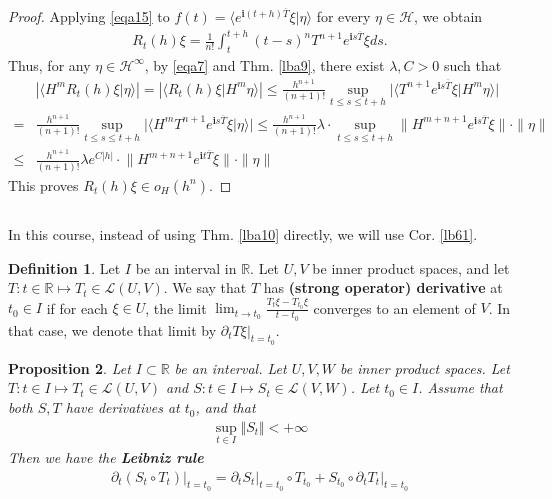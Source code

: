 \documentclass[12pt,b5paper,notitlepage]{article}
\theoremstyle{definition}
\newtheorem{df}{Definition}[section]
\theoremstyle{plain}
\newtheorem{pp}[df]{Proposition}
\newcommand{\mc}{\mathcal}
\newcommand{\ovl}{\overline}
\newcommand{\bk}[1]{\langle {#1}\rangle}
\newcommand{\im}{\mathbf{i}}
\newcommand{\Rbb}{\mathbb R}
\newcommand{\dps}{\displaystyle}
\numberwithin{equation}{section}
\begin{document}
\begin{proof}
Applying \eqref{eqa15} to $f(t)=\bk{e^{\im(t+h)\ovl T}\xi|\eta}$ for every $\eta\in\mc H$, we obtain
\begin{align*}
R_t(h)\xi=\frac 1{n!}\int_t^{t+h}(t-s)^nT^{n+1}e^{\im s\ovl T}\xi ds.
\end{align*}
Thus, for any $\eta\in\mc H^\infty$, by \eqref{eqa7} and Thm. \ref{lba9}, there exist $\lambda,C>0$ such that
\begin{align*}
&|\bk{H^mR_t(h)\xi|\eta}|=|\bk{R_t(h)\xi|H^m\eta}|\leq \frac {h^{n+1}}{(n+1)!}\sup_{t\leq s\leq t+h}\big|\bk{T^{n+1}e^{\im s\ovl T}\xi|H^m\eta}\big|\\
=&\frac {h^{n+1}}{(n+1)!}\sup_{t\leq s\leq t+h}\big|\bk{H^mT^{n+1}e^{\im s\ovl T}\xi|\eta}\big|\leq\frac {h^{n+1}}{(n+1)!}\lambda\cdot\sup_{t\leq s\leq t+h}\lVert H^{m+n+1}e^{\im s\ovl T}\xi\lVert\cdot\lVert\eta\lVert\\
	\leq&\frac {h^{n+1}}{(n+1)!}\lambda e^{C|h|}\cdot\lVert H^{m+n+1}e^{\im t\ovl T}\xi\lVert\cdot\lVert\eta\lVert
\end{align*}
This proves $R_t(h)\xi\in o_H(h^n)$.
\end{proof}
	


\subsection{}


In this course, instead of using Thm. \ref{lba10} directly, we will use Cor. \ref{lb61}.

\begin{df}
Let $I$ be an interval in $\Rbb$. Let $U,V$ be inner product spaces, and let $T:t\in\Rbb\mapsto T_t\in\mc L(U,V)$. We say that $T$ has \textbf{(strong operator) derivative} at $t_0\in I$ if for each $\xi\in U$, the limit $\dps\lim_{t\rightarrow t_0}\frac{T_t\xi-T_{t_0}\xi}{t-t_0}$ converges to an element of $V$. In that case, we denote that limit by $\partial_tT\xi|_{t=t_0}$.
\end{df}


\begin{pp}\label{lb62}
Let $I\subset\Rbb$ be an interval. Let $U,V,W$ be inner product spaces. Let $T:t\in I\mapsto T_t\in\mc L(U,V)$ and $S:t\in I\mapsto S_t\in\mc L(V,W)$. Let $t_0\in I$. Assume that both $S,T$ have derivatives at $t_0$, and that
\begin{align}\label{eq84}
\sup_{t\in I}\Vert S_t\Vert<+\infty
\end{align}
Then we have the \textbf{Leibniz rule}
\begin{align*}
\partial_t(S_t\circ T_t)\big|_{t=t_0}=\partial_tS_t\big|_{t=t_0}\circ T_{t_0}+S_{t_0}\circ \partial_tT_t\big|_{t=t_0}
\end{align*}
\end{pp}
\end{document}
